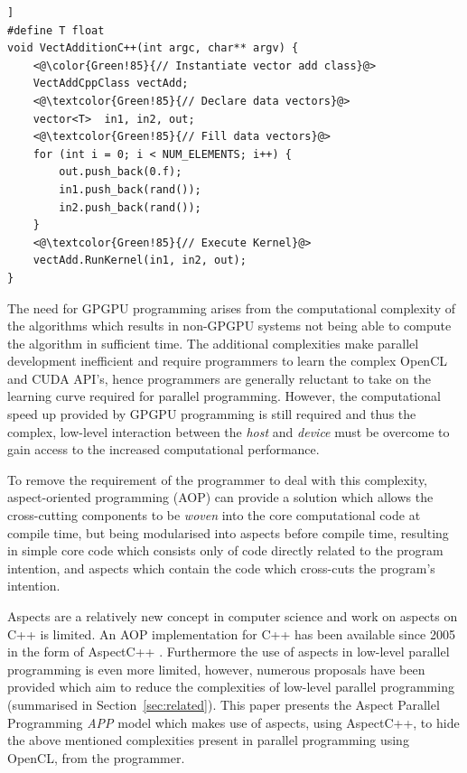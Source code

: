 \documentclass{sig-alternate-05-2015}
\begin{document}

\begin{lstlisting}[caption=Vector addition using
C++,label=vectcppi,float=[t!]]
#define T float
void VectAdditionC++(int argc, char** argv) {
	<@\color{Green!85}{// Instantiate vector add class}@>
	VectAddCppClass vectAdd;
	<@\textcolor{Green!85}{// Declare data vectors}@>
	vector<T>  in1, in2, out;
	<@\textcolor{Green!85}{// Fill data vectors}@>
	for (int i = 0; i < NUM_ELEMENTS; i++) {
		out.push_back(0.f);
		in1.push_back(rand());
		in2.push_back(rand());
	}
	<@\textcolor{Green!85}{// Execute Kernel}@>
	vectAdd.RunKernel(in1, in2, out);
}
\end{lstlisting}


The need for GPGPU programming arises from the computational complexity of the
algorithms which results in non-GPGPU systems not being able to compute the
algorithm in sufficient time. The additional complexities make parallel
development inefficient and require programmers to learn the complex OpenCL and
CUDA API's, hence programmers are generally reluctant to take on the learning
curve required for parallel programming. However, the computational speed up
provided by GPGPU programming is still required and thus the complex, low-level
interaction between the \textit{host} and \textit{device} must be overcome to
gain access to the increased computational performance.

To remove the requirement of the programmer to deal with this complexity, 
aspect-oriented programming  (AOP) \cite{gregor:aop} can provide a solution which 
allows the cross-cutting components to be \textit{woven} into the core computational 
code at compile time, but being modularised into aspects before compile time, resulting 
in simple core code which consists only of code directly related to the program
intention, and aspects which contain the code which cross-cuts the program's
intention.

Aspects are a relatively new concept in computer science and work on aspects on
C++ is limited. An AOP implementation for C++ has been available since 2005 in
the form of AspectC++ \cite{acpp}. Furthermore the use of aspects in low-level
parallel programming is even more limited, however, numerous proposals have been
provided which aim to reduce the complexities of low-level parallel programming
(summarised in Section~\ref{sec:related}). This paper presents the Aspect Parallel
Programming \textit{APP} model which makes use of aspects, using AspectC++, to 
hide the above mentioned complexities present in parallel programming using
OpenCL, from the programmer. 
\end{document}
